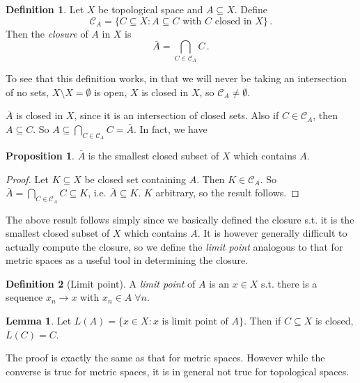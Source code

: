 \documentclass[a4paper,11pt]{article}
\theoremstyle{definition}
\newtheorem*{defn}{Definition}
\newtheorem*{prop}{Proposition}
\newtheorem*{lem}{Lemma}
\numberwithin{equation}{section}
\begin{document}
\begin{defn}
    Let $X$ be topological space and $A\subseteq X$. Define 
    \begin{equation}
        \mathcal{C}_A = \{C\subseteq X: A\subseteq C\text{ with }C\text{ closed in }X\} \,.
    \end{equation}
    Then the \emph{closure} of $A$ in $X$ is 
    \begin{equation}
        \bar{A} = \bigcap_{C\in\mathcal{C}_A} C\,.
    \end{equation}
\end{defn}

To see that this definition works, in that we will never be taking an intersection of no sets, $X\setminus X=\emptyset$ is open, $X$ is closed in $X$, so $\mathcal{C}_A\neq\emptyset$.

$\bar{A}$ is closed in $X$, since it is an intersection of closed sets. Also if $C\in\mathcal{C}_A$, then $A\subseteq C$. So $A\subseteq\bigcap_{C\in\mathcal{C}_A}C=\bar{A}$. In fact, we have

\begin{prop}
$\bar{A}$ is the smallest closed subset of $X$ which contains $A$.
\end{prop}

\begin{proof}
Let $K\subseteq X$ be closed set containing $A$. Then $K\in \mathcal{C}_A$. So $\bar{A}=\bigcap_{C\in\mathcal{C}_A}C\subseteq K$, i.e. $\bar{A}\subseteq K$. $K$ arbitrary, so the result follows.
\end{proof}

The above result follows simply since we basically defined the closure s.t. it is the smallest closed subset of $X$ which contains $A$. It is however generally difficult to actually compute the closure, so we define the \emph{limit point} analogous to that for metric spaces as a useful tool in determining the closure.

\begin{defn}[Limit point]
    A \emph{limit point} of $A$ is an $x\in X$ s.t. there is a sequence $x_n\rightarrow x$ with $x_n\in A\;\forall n$.
\end{defn}

\begin{lem}
    Let $L(A)=\{x\in X:x \text{ is limit point of }A\}$. Then if $C\subseteq X$ is closed, $L(C)=C$.
\end{lem}

The proof is exactly the same as that for metric spaces. However while the converse is true for metric spaces, it is in general not true for topological spaces.
\end{document}
